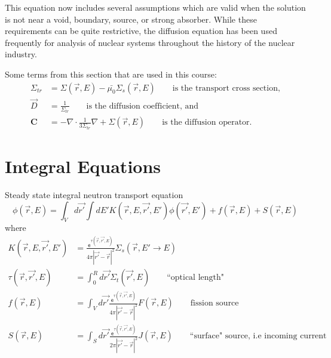 \documentclass[12pt]{article}
\newcommand{\ve}[1]{\ensuremath{\mathbf{#1}}}
\newcommand{\Macro}{\ensuremath{\Sigma}}
\begin{document}
This equation now includes several assumptions which are valid when the solution is not near a void, boundary, source, or strong absorber. While these requirements can be quite restrictive, the diffusion equation has been used frequently for analysis of nuclear systems throughout the history of the nuclear industry.

Some terms from this section that are used in this course:
\begin{align}
  \Macro_{tr} &= \Macro(\vec{r},E) - \bar{\mu_{0}}\Macro_{s}(\vec{r},E) \qquad \text{is the transport cross section,}\\
  \vec{D} &= \frac{1}{\Macro_{tr}} \qquad \text{is the diffusion coefficient, and}\\
  \ve{C} &= -\nabla \cdot \frac{1}{3\Macro_{tr}}\nabla+ \Macro(\vec{r},E) \qquad \text{is the diffusion operator.}
\end{align}

\section{Integral Equations}

Steady state integral neutron transport equation
%
\begin{equation}
\phi(\vec{r}, E) = \int_V d\vec{r'} \int dE' K(\vec{r}, E, \vec{r'}, E') \phi(\vec{r'}, E') + f(\vec{r}, E) + S(\vec{r}, E) \nonumber
\end{equation}
%
where
\begin{align}
K(\vec{r}, E, \vec{r'}, E') &= \frac{\mathsf{e}^{\tau(\vec{r}, \vec{r'}, E)}}{4\pi |\vec{r'} - \vec{r}|^2} \Macro_s(\vec{r}, E' \rightarrow E) \nonumber \\
%
\tau(\vec{r}, \vec{r'}, E) &= \int_0^R d\vec{r'} \Macro_t(\vec{r'}, E) \qquad \text{``optical length"} \nonumber \\
%
f(\vec{r}, E) &= \int_V d\vec{r'}\frac{\mathsf{e}^{\tau(\vec{r}, \vec{r'}, E)}}{4\pi |\vec{r'} - \vec{r}|^2} F(\vec{r}, E) \qquad \text{fission source}\nonumber \\
%
S(\vec{r}, E) &= \int_S d\vec{r'}\frac{\mathsf{e}^{\tau(\vec{r}, \vec{r'}, E)}}{2\pi |\vec{r'} - \vec{r}|^2} J(\vec{r}, E) \qquad \text{``surface" source, i.e\ incoming current} \nonumber
\end{align}
\end{document}

